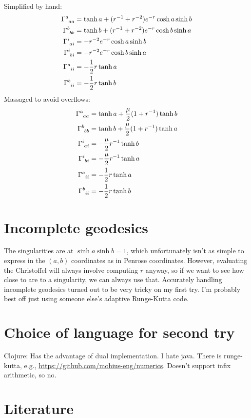 \documentclass{article}
\begin{document}
Simplified by hand:
\begin{align*}
\Gamma\indices{^a_a_a} &= \tanh a + (r^{-1}+r^{-2})e^{-r}\cosh a\sinh b \\
\Gamma\indices{^b_b_b} &= \tanh b + (r^{-1}+r^{-2})e^{-r}\cosh b\sinh a \\
\Gamma\indices{^i_a_i} &= -r^{-2}e^{-r}\cosh a\sinh b  \\
\Gamma\indices{^i_b_i} &= -r^{-2}e^{-r}\cosh b\sinh a  \\
\Gamma\indices{^a_i_i} &= -\frac{1}{2}r\tanh a\\
\Gamma\indices{^b_i_i} &= -\frac{1}{2}r\tanh b
\end{align*}
Massaged to avoid overflows:
\begin{align*}
\Gamma\indices{^a_a_a} &= \tanh a + \frac{\mu}{2}(1+r^{-1})\tanh b \\
\Gamma\indices{^b_b_b} &= \tanh b + \frac{\mu}{2}(1+r^{-1})\tanh a \\
\Gamma\indices{^i_a_i} &= -\frac{\mu}{2}r^{-1}\tanh b  \\
\Gamma\indices{^i_b_i} &= -\frac{\mu}{2}r^{-1}\tanh a  \\
\Gamma\indices{^a_i_i} &= -\frac{1}{2}r\tanh a\\
\Gamma\indices{^b_i_i} &= -\frac{1}{2}r\tanh b
\end{align*}

\section{Incomplete geodesics}
The singularities are at $\sinh a\sinh b=1$, which unfortunately isn't as simple to express in the
$(a,b)$ coordinates as in Penrose coordinates. However, evaluating the Christoffel will always
involve computing $r$ anyway, so if we want to see how close to are to a singularity, we can always
use that. Accurately handling incomplete geodesics turned out to be very tricky on my first try.
I'm probably best off just using someone else's adaptive Runge-Kutta code.

\section{Choice of language for second try}
Clojure: Has the advantage of dual implementation. I hate java. There is runge-kutta, e.g.,
\url{https://github.com/mobius-eng/numerics}. Doesn't support infix arithmetic, so no.


\section{Literature}
\end{document}
